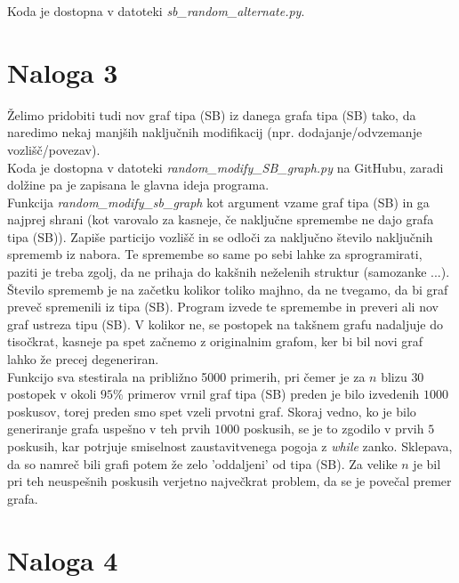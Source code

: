 \documentclass{article}
\begin{document}
Koda je dostopna v datoteki \textit{sb\_random\_alternate.py}.


\section{Naloga 3}

Želimo pridobiti tudi nov graf tipa (SB) iz danega grafa tipa (SB) tako, 
da naredimo nekaj manjših naključnih modifikacij (npr. dodajanje/odvzemanje 
vozlišč/povezav). 
\\
Koda je dostopna v datoteki \textit{random\_modify\_SB\_graph.py} na GitHubu, zaradi 
dolžine pa je zapisana le glavna ideja programa. 
\\Funkcija \textit{random\_modify\_sb\_graph} kot argument vzame graf tipa (SB) in 
ga najprej shrani (kot varovalo za kasneje, če naključne spremembe ne dajo 
grafa tipa (SB)). Zapiše particijo vozlišč in se odloči za naključno število 
naključnih sprememb iz nabora. Te spremembe so same po sebi lahke za sprogramirati, paziti 
je treba zgolj, da ne prihaja do kakšnih neželenih struktur (samozanke ...). Število sprememb je na začetku kolikor toliko majhno, da ne tvegamo,
da bi graf preveč spremenili iz tipa (SB). Program izvede te spremembe in preveri ali nov graf ustreza tipu (SB).
V kolikor ne, se postopek na takšnem grafu nadaljuje do tisočkrat, kasneje pa 
spet začnemo z originalnim grafom, ker bi bil novi graf lahko že precej degeneriran.
\\
Funkcijo sva stestirala na približno 5000 primerih, pri čemer je za $n$ blizu $30$ postopek 
v okoli $95 \%$ primerov vrnil graf tipa (SB) preden je bilo izvedenih $1000$ poskusov, torej preden smo  
spet vzeli prvotni graf. Skoraj vedno, ko je bilo generiranje grafa uspešno v teh prvih $1000$ poskusih,
se je to zgodilo v prvih $5$ poskusih, kar potrjuje smiselnost zaustavitvenega pogoja z \emph{while} zanko.
Sklepava, da so namreč bili grafi potem že zelo 'oddaljeni' od tipa (SB). Za velike $n$ je bil pri teh neuspešnih 
poskusih verjetno največkrat problem, da se je povečal premer grafa.

\section{Naloga 4}
\end{document}
